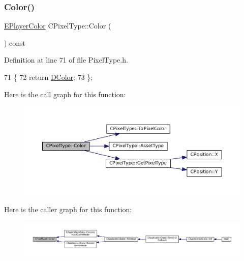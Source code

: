 \subsubsection{\texorpdfstring{Color()}{Color()}}
{\footnotesize\ttfamily \hyperlink{GameDataTypes_8h_aafb0ca75933357ff28a6d7efbdd7602f}{E\+Player\+Color} C\+Pixel\+Type\+::\+Color (\begin{DoxyParamCaption}{ }\end{DoxyParamCaption}) const\hspace{0.3cm}{\ttfamily [inline]}}



Definition at line 71 of file Pixel\+Type.\+h.


\begin{DoxyCode}
71                                   \{
72             \textcolor{keywordflow}{return} \hyperlink{classCPixelType_a474243cf748aee94cfa207659e940b6c}{DColor};  
73         \};
\end{DoxyCode}
Here is the call graph for this function\+:\nopagebreak
\begin{figure}[H]
\begin{center}
\leavevmode
\includegraphics[width=350pt]{classCPixelType_a54864220447608dfad4cd579a5a4016c_cgraph}
\end{center}
\end{figure}
Here is the caller graph for this function\+:\nopagebreak
\begin{figure}[H]
\begin{center}
\leavevmode
\includegraphics[width=350pt]{classCPixelType_a54864220447608dfad4cd579a5a4016c_icgraph}
\end{center}
\end{figure}
\hypertarget{classCPixelType_af38a22feec4bef33deeb628b0877d464}{}\label{classCPixelType_af38a22feec4bef33deeb628b0877d464} 
